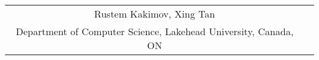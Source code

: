 \begin{tabular}{cc}
Rustem Kakimov\upstairs{\affilone,*}, Xing Tan\upstairs{\affilone,*}%
\\[0.25ex]
{\small \upstairs{\affilone} Department of Computer Science, Lakehead University, Canada, ON} \\
\end{tabular}
    
\vspace*{0.2in}